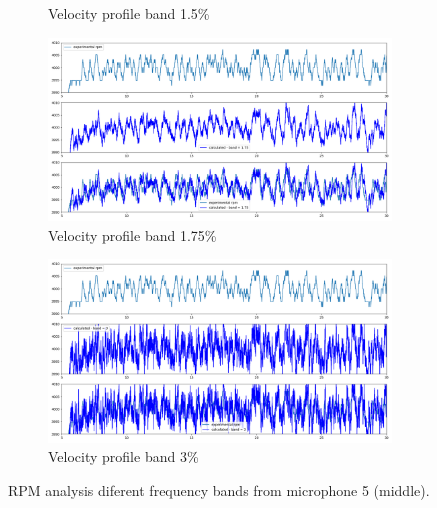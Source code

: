\documentclass[10pt,fleqn,a4paper,twoside]{article}
\begin{document}
\begin{figure}
\begin{subfigure}{0.4\textwidth}
            \caption{Velocity profile band 1.5\%}
            \label{fig:sixth}
        \end{subfigure}
        \centering
        \hfill
        \begin{subfigure}{0.4\textwidth}
            \includegraphics[width=\textwidth]{Figures/rpm_analysis_mic4_band_1.75.png}
            \caption{Velocity profile band 1.75\%}
            \label{fig:seventh}
        \end{subfigure}
        \centering
        \hfill 
        \begin{subfigure}{0.4\textwidth}
            \includegraphics[width=\textwidth]{Figures/rpm_analysis_mic4_band_3.png}
            \caption{Velocity profile band 3\%}
            \label{fig:eigth}
        \end{subfigure}
                
        \caption{RPM analysis diferent frequency bands from microphone 5 (middle).}
        \label{fig:figures}
        \end{figure}
\end{document}
